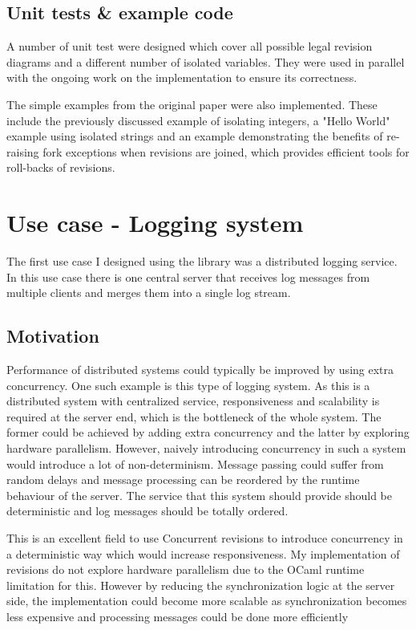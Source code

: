 \documentclass[12pt,twoside,notitlepage]{report}
\begin{document}
\subsection{Unit tests \& example code}
 A number of unit test were designed which cover all possible legal revision diagrams and a different number of isolated variables. They were used in parallel with the ongoing work on the implementation to ensure its correctness. 
 
 The simple examples from the original paper were also implemented. These include the previously discussed example of isolating integers, a "Hello World" example using isolated strings and an example demonstrating the benefits of re-raising fork exceptions when revisions are joined, which provides efficient tools for roll-backs of revisions.
  
\section{Use case - Logging system}
\label{logging} 
The first use case I designed using the library was a distributed logging service. In this use case there is one central server that receives log messages from multiple clients and merges them into a single log stream. 

\subsection{Motivation}
Performance of distributed systems could typically be improved by using extra concurrency. One such example is this type of logging system. 
As this is a distributed system with centralized service, responsiveness and scalability is required at the server end, which is the bottleneck of the whole system. The former could be achieved by adding extra concurrency and the latter by exploring hardware parallelism. However, naively introducing concurrency in such a system would introduce a lot of non-determinism. Message passing could suffer from random delays and message processing can be reordered by the runtime behaviour of the server. The service that this system should provide should be deterministic and log messages should be totally ordered.

This is an excellent field to use Concurrent revisions to introduce concurrency in a deterministic way which would increase responsiveness. My implementation of revisions do not explore hardware parallelism due to the OCaml runtime limitation for this. However by reducing the synchronization logic at the server side, the implementation could become more scalable as synchronization becomes less expensive and processing messages could be done more efficiently
\end{document}
